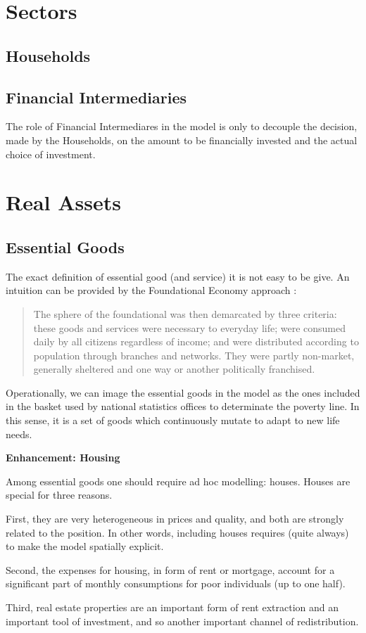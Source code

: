 \documentclass[a4paper, headings=standardclasses]{scrartcl}
\newenvironment{enh}[1][]{\begin{framed}\noindent\textbf{Enhancement: #1}\par}{\end{framed}}
\begin{document}
\section{Sectors}
\subsection{Households}

\subsection{Financial Intermediaries}
The role of Financial Intermediares in the model is only to decouple the decision, made by the Households, on the amount to be financially invested and the actual choice of investment.

\section{Real Assets}
\subsection{Essential Goods}
The exact definition of essential good (and service) it is not easy to be give. An intuition can be provided by the Foundational Economy approach \parencite{arcidiacono2018a}: \begin{quote}
	The sphere of the foundational was then demarcated by three criteria: these goods and services were necessary to everyday life; were consumed daily by all citizens regardless of income; and were distributed according to population through branches and networks. They were partly non-market, generally sheltered and one way or another politically franchised.
\end{quote}

Operationally, we can image the essential goods in the model as the ones included in the basket used by national statistics offices to determinate the poverty line. In this sense, it is a set of goods which continuously mutate to adapt to new life needs.

\begin{enh}[Housing]
	Among essential goods one should require ad hoc modelling: houses. Houses are special for three reasons.
	
	First, they are very heterogeneous in prices and quality, and both are strongly related to the position. In other words, including houses requires (quite always) to make the model spatially explicit.
	
	Second, the expenses for housing, in form of rent or mortgage, account for a significant part of monthly consumptions for poor individuals (up to one half).
	
	Third, real estate properties are an important form of rent extraction and an important tool of investment, and so another important channel of redistribution.
\end{enh}
\end{document}
